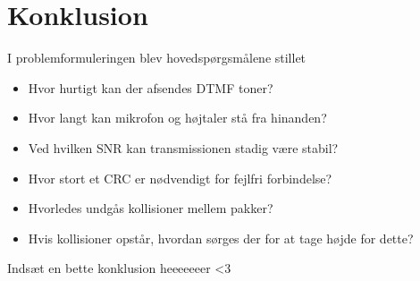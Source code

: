 \section{Konklusion}
I problemformuleringen blev hovedspørgsmålene stillet

\begin{itemize}
	\item	Hvor hurtigt kan der afsendes DTMF toner?
	\item	Hvor langt kan mikrofon og højtaler stå fra hinanden?
	\item	Ved hvilken SNR kan transmissionen stadig være stabil?
	\item	Hvor stort et CRC er nødvendigt for fejlfri forbindelse?
	\item	Hvorledes undgås kollisioner mellem pakker?
	\item	Hvis kollisioner opstår, hvordan sørges der for at tage højde for dette?
\end{itemize}

Indsæt en bette konklusion heeeeeeer <3